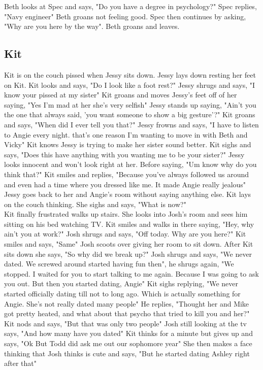 \documentclass{article}[12px] %
\begin{document}
Beth looks at Spec and says, "Do you have a degree in psychology?" Spec replies, "Navy engineer" Beth groans not feeling good. Spec then continues by asking, "Why are you here by the way". Beth groans and leaves.\\

\subsection* {Kit}
Kit is on the couch pissed when Jessy sits down. Jessy lays down resting her feet on Kit. Kit looks and says, "Do I look like a foot rest?" Jessy shrugs and says, "I know your pissed at my sister" Kit groans and moves Jessy's feet off of her saying, "Yes I'm mad at her she's very selfish" Jessy stands up saying, "Ain't you the one that always said, 'you want someone to show a big gesture'?" Kit groans and says, "When did I ever tell you that?" Jessy frowns and says, "I have to listen to Angie every night. that's one reason I'm wanting to move in with Beth and Vicky" Kit knows Jessy is trying to make her sister sound better. Kit sighs and says, "Does this have anything with you wanting me to be your sister?" Jessy looks innocent and won't look right at her. Before saying, "Um know why do you think that?" Kit smiles and replies, "Because you've always followed us around and even had a time where you dressed like me. It made Angie really jealous"\\

Jessy goes back to her and Angie's room without saying anything else. Kit lays on the couch thinking. She sighs and says, "What is now?"\\

Kit finally frustrated walks up stairs. She looks into Josh's room and sees him sitting on his bed watching TV. Kit smiles and walks in there saying, "Hey, why ain't you at work?" Josh shrugs and says, "Off today. Why are you here?" Kit smiles and says, "Same" Josh scoots over giving her room to sit down. After Kit sits down she says, "So why did we break up?" Josh shrugs and says, "We never dated. We screwed around started having fun then", he shrugs again, "We stopped. I waited for you to start talking to me again. Because I was going to ask you out. But then you started dating, Angie" Kit sighs replying, "We never started officially dating till not to long ago. Which is actually something for Angie. She's not really dated many people" He replies, "Thought her and Mike got pretty heated, and what about that psycho that tried to kill you and her?" Kit nods and says, "But that was only two people" Josh still looking at the tv says, "And how many have you dated" Kit thinks for a minute but gives up and says, "Ok But Todd did ask me out our sophomore year" She then makes a face thinking that Josh thinks is cute and says, "But he started dating Ashley right after that"\\
\end{document}
